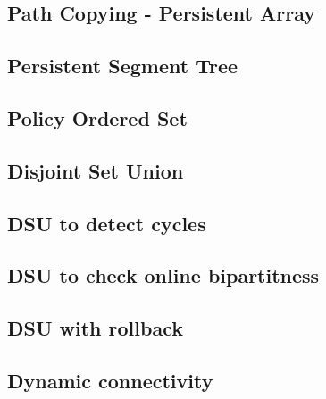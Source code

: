 \documentclass[10pt]{article}
\begin{document}
\begin{multicols*}{2}
\subsection{Path Copying - Persistent Array}


\subsection{Persistent Segment Tree}


\subsection{Policy Ordered Set}


\subsection{Disjoint Set Union}


\subsection{DSU to detect cycles}


\subsection{DSU to check online bipartitness}


\subsection{DSU with rollback}


\subsection{Dynamic connectivity}



\end{multicols*}
\end{document}
